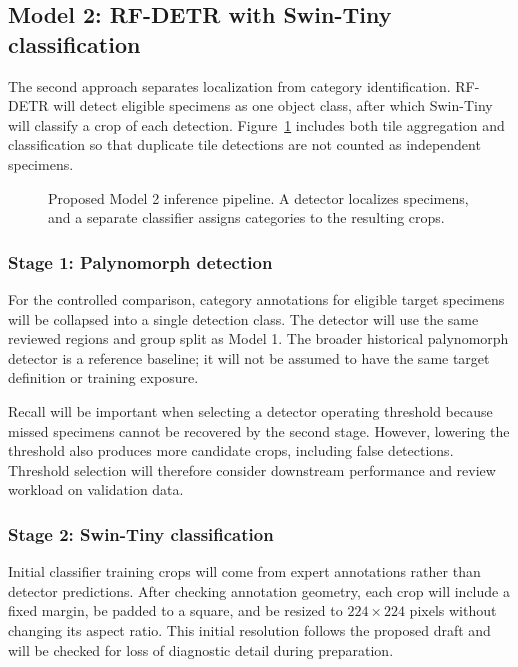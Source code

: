 \documentclass[11pt,letterpaper]{article}
\begin{document}
\subsection{Model 2: RF-DETR with Swin-Tiny classification}
The second approach separates localization from category identification. RF-DETR will detect eligible specimens as one object class, after which Swin-Tiny will classify a crop of each detection. Figure~\ref{fig:model2} includes both tile aggregation and classification so that duplicate tile detections are not counted as independent specimens.

\begin{figure}[htbp]
\centering
{}
\caption{Proposed Model 2 inference pipeline. A detector localizes specimens, and a separate classifier assigns categories to the resulting crops.}
\label{fig:model2}
\end{figure}

\subsubsection{Stage 1: Palynomorph detection}
For the controlled comparison, category annotations for eligible target specimens will be collapsed into a single detection class. The detector will use the same reviewed regions and group split as Model 1. The broader historical palynomorph detector is a reference baseline; it will not be assumed to have the same target definition or training exposure.

Recall will be important when selecting a detector operating threshold because missed specimens cannot be recovered by the second stage. However, lowering the threshold also produces more candidate crops, including false detections. Threshold selection will therefore consider downstream performance and review workload on validation data.

\subsubsection{Stage 2: Swin-Tiny classification}
Initial classifier training crops will come from expert annotations rather than detector predictions. After checking annotation geometry, each crop will include a fixed margin, be padded to a square, and be resized to $224\times224$ pixels without changing its aspect ratio. This initial resolution follows the proposed draft and will be checked for loss of diagnostic detail during preparation.
\end{document}
